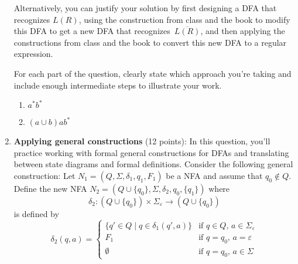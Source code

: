 \begin{enumerate}[wide, labelwidth=!, labelindent=0pt]
Alternatively, you can justify your solution by first designing a DFA that recognizes $L(R)$, 
using the construction from class and the book to modify this DFA to get a new DFA that recognizes~$\overline{L(R)}$, 
and then applying the constructions from class and the book to convert this new DFA to a regular expression.

For each part of the question, clearly state which approach you're taking and include enough intermediate
steps to illustrate your work.


\begin{enumerate}
    \item\gradeCorrect $a^*b^*$
    \item\gradeCorrect $(a \cup b) a b^*$
\end{enumerate}


\item\textbf{Applying general constructions} (12 points):
In this question, you'll practice working with formal general constructions
for DFAs and translating between state diagrams and formal definitions.
Consider the following general construction: Let $N_1 = (Q, \Sigma, \delta_1, q_1, F_1)$ be a NFA
and assume that $q_0 \notin Q$.
Define the new NFA $N_2 = (Q \cup \{q_0\}, \Sigma, \delta_2, q_0, \{q_1\})$ where 
$$\delta_2: (Q \cup \{q_0\}) \times \Sigma_\varepsilon \to (Q \cup \{q_0\})$$ is defined by
\[
    \delta_2 (q,a) = \begin{cases}
        \{ q' \in Q \mid q \in \delta_1(q',a)\} &\text{if $q \in Q$, $a \in \Sigma_{\varepsilon}$} \\
        F_1 &\text{if $q =q_0$, $a = \varepsilon$}\\
        \emptyset &\text{if $q = q_0$, $a \in \Sigma$}
    \end{cases}
\]


\end{enumerate}
